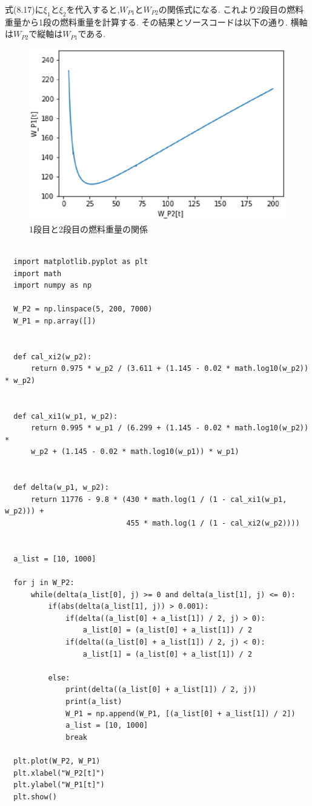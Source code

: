 式(8.17)に$\xi_1$と$\xi_2$を代入すると,$W_{P1}$と$W_{P2}$の関係式になる.
これより2段目の燃料重量から1段の燃料重量を計算する.
その結果とソースコードは以下の通り.
横軸は$W_{P2}$で縦軸は$W_{P1}$である.

\begin{figure}[H]
  \caption{1段目と2段目の燃料重量の関係}
\begin{center}
  \includegraphics{saitekika0.eps}
\end{center}
\end{figure}
\newpage

\begin{lstlisting}[basicstyle=\ttfamily\footnotesize, frame=single]

  import matplotlib.pyplot as plt
  import math
  import numpy as np

  W_P2 = np.linspace(5, 200, 7000)
  W_P1 = np.array([])


  def cal_xi2(w_p2):
      return 0.975 * w_p2 / (3.611 + (1.145 - 0.02 * math.log10(w_p2)) * w_p2)


  def cal_xi1(w_p1, w_p2):
      return 0.995 * w_p1 / (6.299 + (1.145 - 0.02 * math.log10(w_p2)) *
      w_p2 + (1.145 - 0.02 * math.log10(w_p1)) * w_p1)


  def delta(w_p1, w_p2):
      return 11776 - 9.8 * (430 * math.log(1 / (1 - cal_xi1(w_p1, w_p2))) +
                            455 * math.log(1 / (1 - cal_xi2(w_p2))))


  a_list = [10, 1000]

  for j in W_P2:
      while(delta(a_list[0], j) >= 0 and delta(a_list[1], j) <= 0):
          if(abs(delta(a_list[1], j)) > 0.001):
              if(delta((a_list[0] + a_list[1]) / 2, j) > 0):
                  a_list[0] = (a_list[0] + a_list[1]) / 2
              if(delta((a_list[0] + a_list[1]) / 2, j) < 0):
                  a_list[1] = (a_list[0] + a_list[1]) / 2

          else:
              print(delta((a_list[0] + a_list[1]) / 2, j))
              print(a_list)
              W_P1 = np.append(W_P1, [(a_list[0] + a_list[1]) / 2])
              a_list = [10, 1000]
              break

  plt.plot(W_P2, W_P1)
  plt.xlabel("W_P2[t]")
  plt.ylabel("W_P1[t]")
  plt.show()

\end{lstlisting}

